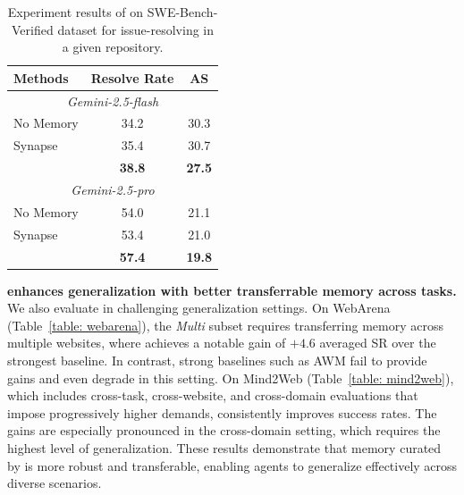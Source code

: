 \begin{table}
\vspace{-5mm}
\centering\setlength{\tabcolsep}{4pt}
\small
\setlength{\belowcaptionskip}{1pt}
  \caption{Experiment results of \ours{} on SWE-Bench-Verified dataset for issue-resolving in a given repository.}
  \label{table: swebench}
  \begin{tabular}{lcc}
    \toprule
    Methods & Resolve Rate & AS\\
    \midrule
    \multicolumn{3}{c}{\cellcolor{gray!15}\textit{Gemini-2.5-flash}}\\
    No Memory & 34.2&30.3\\
    Synapse& 35.4&30.7\\
    \ours{} & \textbf{38.8}& \textbf{27.5}\\
    \midrule
    \multicolumn{3}{c}{\cellcolor{gray!15}\textit{Gemini-2.5-pro}} \\
    No Memory&54.0&21.1\\
    Synapse&53.4&21.0 \\
    \ours{} & \textbf{57.4}&\textbf{19.8}\\
  \bottomrule
\end{tabular}
\vspace{-3mm}
\end{table}

\noindent\textbf{\ours{} enhances generalization with better transferrable memory across tasks.} 
We also evaluate in challenging generalization settings. On WebArena (Table~\ref{table: webarena}), the \textit{Multi} subset requires transferring memory across multiple websites, where \ours{} achieves a notable gain of $+4.6$ averaged SR over the strongest baseline. In contrast, strong baselines such as AWM fail to provide gains and even degrade in this setting. On Mind2Web (Table~\ref{table: mind2web}), which includes cross-task, cross-website, and cross-domain evaluations that impose progressively higher demands, \ours{} consistently improves success rates. The gains are especially pronounced in the cross-domain setting, which requires the highest level of generalization. These results demonstrate that memory curated by \ours{} is more robust and transferable, enabling agents to generalize effectively across diverse scenarios.

